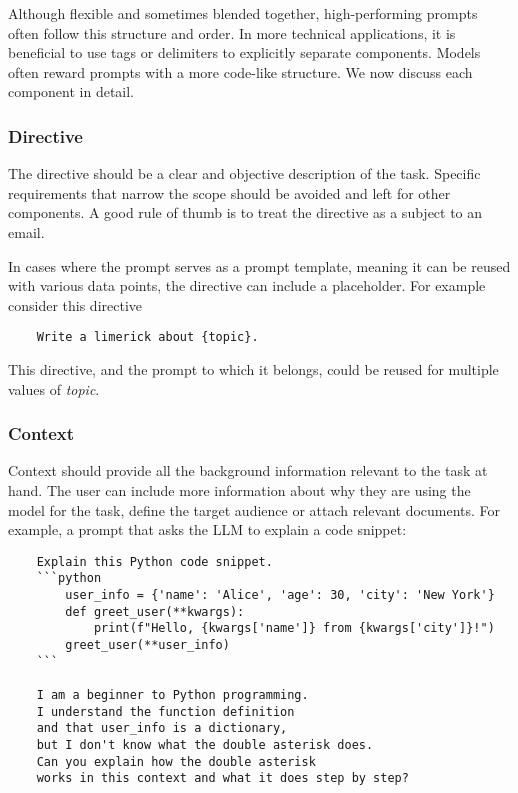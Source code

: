 Although flexible and sometimes blended together, high-performing prompts often follow this structure and order. 
In more technical applications, it is beneficial to use tags or delimiters to explicitly separate components.
Models often reward prompts with a more code-like structure\cite{10.1145/3544548.3581388}. 
We now discuss each component in detail.

\subsubsection{Directive}
The directive should be a clear and objective description of the task. 
Specific requirements that narrow the scope should be avoided and left for other components.
A good rule of thumb is to treat the directive as a subject to an email. 

In cases where the prompt serves as a prompt template, meaning it can be reused with various data points,
the directive can include a placeholder. For example consider this directive
\begin{verbatim}
    Write a limerick about {topic}.
\end{verbatim}
This directive, and the prompt to which it belongs, could be reused for multiple values of \textit{topic}.

\subsubsection{Context}
Context should provide all the background information relevant to the task at hand.
The user can include more information about why they are using the model for the task,
define the target audience or attach relevant documents. For example, a prompt that asks the LLM to explain a code snippet:

\begin{verbatim}
    Explain this Python code snippet.
    ```python
        user_info = {'name': 'Alice', 'age': 30, 'city': 'New York'}
        def greet_user(**kwargs):
            print(f"Hello, {kwargs['name']} from {kwargs['city']}!")
        greet_user(**user_info)
    ```
    
    I am a beginner to Python programming. 
    I understand the function definition 
    and that user_info is a dictionary, 
    but I don't know what the double asterisk does. 
    Can you explain how the double asterisk 
    works in this context and what it does step by step?
    \end{verbatim} 

